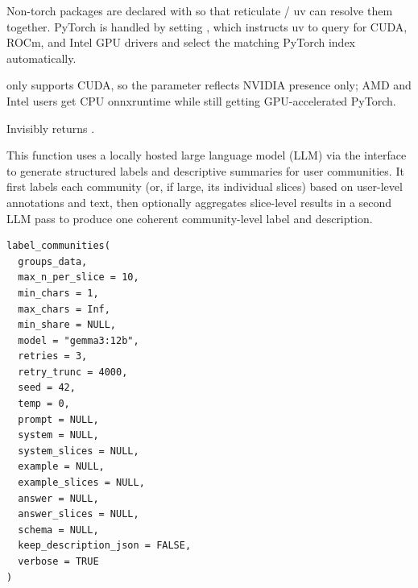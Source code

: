 \documentclass[a4paper]{book}
\begin{document}
%
\begin{Details}
Non-torch packages are declared with  so that reticulate /
uv can resolve them together. PyTorch is handled by setting
, which instructs uv to query for CUDA, ROCm,
and Intel GPU drivers and select the matching PyTorch index automatically.

 only supports CUDA, so the  parameter
reflects NVIDIA presence only; AMD and Intel users get CPU onnxruntime while
still getting GPU-accelerated PyTorch.
\end{Details}
%
\begin{Value}
Invisibly returns .
\end{Value}
%
\begin{Description}
This function uses a locally hosted large language model (LLM) via the  interface
to generate structured labels and descriptive summaries for user communities. It first labels
each community (or, if large, its individual slices) based on user-level annotations and text,
then optionally aggregates slice-level results in a second LLM pass to produce one coherent
community-level label and description.
\end{Description}
%
\begin{Usage}
\begin{verbatim}
label_communities(
  groups_data,
  max_n_per_slice = 10,
  min_chars = 1,
  max_chars = Inf,
  min_share = NULL,
  model = "gemma3:12b",
  retries = 3,
  retry_trunc = 4000,
  seed = 42,
  temp = 0,
  prompt = NULL,
  system = NULL,
  system_slices = NULL,
  example = NULL,
  example_slices = NULL,
  answer = NULL,
  answer_slices = NULL,
  schema = NULL,
  keep_description_json = FALSE,
  verbose = TRUE
)
\end{verbatim}
\end{Usage}
%
\end{document}
